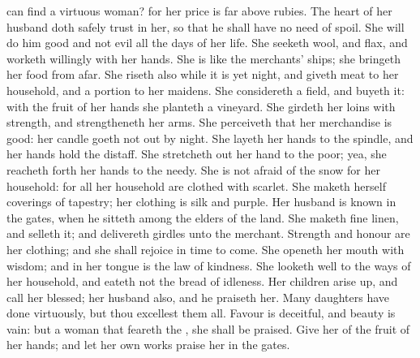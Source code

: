 
\vspace{-0.15\baselineskip}

 can find a virtuous woman? for her price is far above rubies. The heart of her husband doth safely trust in her, so that he shall have no need of spoil. She will do him good and not evil all the days of her life. She seeketh wool, and flax, and worketh willingly with her hands. She is like the merchants' ships; she bringeth her food from afar. She riseth also while it is yet night, and giveth meat to her household, and a portion to her maidens. She considereth a field, and buyeth it: with the fruit of her hands she planteth a vineyard. She girdeth her loins with strength, and strengtheneth her arms. She perceiveth that her merchandise is good: her candle goeth not out by night. She layeth her hands to the spindle, and her hands hold the distaff. She stretcheth out her hand to the poor; yea, she reacheth forth her hands to the needy. She is not afraid of the snow for her household: for all her household are clothed with scarlet. She maketh herself coverings of tapestry; her clothing is silk and purple. Her husband is known in the gates, when he sitteth among the elders of the land. She maketh fine linen, and selleth it; and delivereth girdles unto the merchant. Strength and honour are her clothing; and she shall rejoice in time to come. She openeth her mouth with wisdom; and in her tongue is the law of kindness. She looketh well to the ways of her household, and eateth not the bread of idleness. Her children arise up, and call her blessed; her husband also, and he praiseth her. Many daughters have done virtuously, but thou excellest them all. Favour is deceitful, and beauty is vain: but a woman that feareth the , she shall be praised. Give her of the fruit of her hands; and let her own works praise her in the gates.


